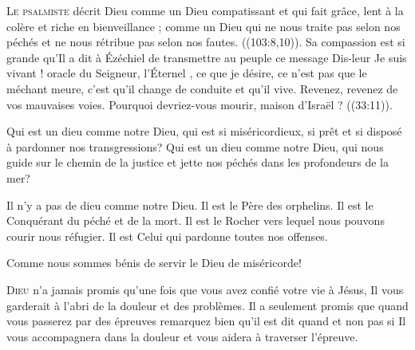 \lettrine{L}{e psalmiste} décrit Dieu comme un Dieu \Og compatissant
 et qui fait grâce, lent à la colère et riche en bienveillance \Fg{} ;
 comme un Dieu \Og qui ne nous traite pas selon nos péchés et ne nous rétribue pas
 selon nos fautes. \Fg{} ((103:8,10)).
 Sa compassion est si grande qu'Il a dit à Ézéchiel de transmettre au peuple
 ce message\frcolon{} Dis-leur\frcolon{}  \Og Je suis vivant !
 \ocadr oracle du Seigneur, l'Éternel \fcadr{}, ce que je désire,
 ce n'est pas que le méchant meure, c'est qu'il change de conduite
 et qu'il vive. Revenez, revenez de vos mauvaises voies.
 Pourquoi devriez-vous mourir, maison d'Israël ? \Fg{} ((33:11)). 


Qui est un dieu comme notre Dieu, qui est si miséricordieux,
 si prêt et si disposé à pardonner nos transgressions?
 Qui est un dieu comme notre Dieu, qui nous guide sur le chemin
 de la justice et jette nos péchés dans les profondeurs de la mer? 

Il n'y a pas de dieu comme notre Dieu. Il est le Père des orphelins.
 Il est le Conquérant du péché et de la mort. Il est le Rocher
 vers lequel nous pouvons courir nous réfugier.
 Il est Celui qui pardonne toutes nos offenses. 

Comme nous sommes bénis de servir le Dieu de miséricorde! 

\dvrule






\lettrine{D}{ieu} n'a jamais promis qu'une fois que vous avez confié
 votre vie à Jésus, Il vous garderait à l'abri de la douleur et des problèmes.
 Il a seulement promis que quand vous passerez par des épreuves
 \ocadr remarquez bien qu'il est dit \Og quand \Fg{} et non pas \Og si \Fg{} \fcadr
 Il vous accompagnera dans la douleur et vous aidera à traverser l'épreuve. 


